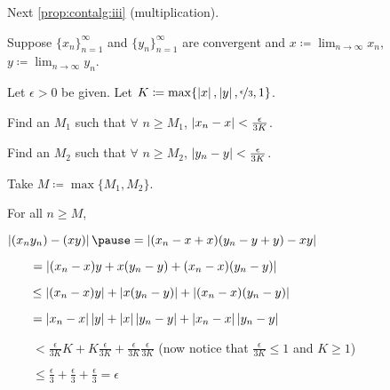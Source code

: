 \documentclass[10pt,aspectratio=169]{beamer}
\begin{document}
\begin{frame}

Next \eqref{prop:contalg:iii} (multiplication).

\pause
\medskip

Suppose $\{ x_n \}_{n=1}^\infty$ and $\{ y_n \}_{n=1}^\infty$ are convergent and
$\displaystyle x \coloneqq \lim_{n\to\infty} x_n$,
$\displaystyle y \coloneqq \lim_{n\to\infty} y_n$.

\pause
\medskip

Let $\epsilon > 0$ be given.
\quad
\pause
Let $K \coloneqq \max\{ \left\lvert {x} \right\rvert, \left\lvert {y} \right\rvert, \nicefrac{\epsilon}{3} , 1 \}$.

\pause
Find an $M_1$ such that $\forall$ $n \geq M_1$,
$\left\lvert {x_n - x} \right\rvert < \frac{\epsilon}{3K}$.

\pause
Find an $M_2$ such that $\forall$ $n \geq M_2$,
$\left\lvert {y_n - y} \right\rvert < \frac{\epsilon}{3K}$.

\pause
Take $M \coloneqq \max \{ M_1, M_2 \}$.

\pause
\medskip

For all $n \geq M$, 

\pause
\medskip

$\displaystyle
\abs{(x_ny_n) - (xy)}
\pause
=
\abs{(x_n-x+x)(y_n-y+y) - xy}
$

\pause
\medskip

$\displaystyle
\qquad
=
\left\lvert {(x_n-x)y + x(y_n-y) +(x_n-x)(y_n-y)} \right\rvert
$

\pause
\medskip

$\displaystyle
\qquad
\leq
\left\lvert {(x_n-x)y} \right\rvert + \left\lvert {x(y_n - y)} \right\rvert +
\left\lvert {(x_n-x)(y_n-y)} \right\rvert 
$

\pause
\medskip

$\displaystyle
\qquad
=
\left\lvert {x_n -x} \right\rvert\left\lvert {y} \right\rvert + 
\left\lvert {x} \right\rvert\left\lvert {y_n -y} \right\rvert + 
\left\lvert {x_n -x} \right\rvert\left\lvert {y_n -y} \right\rvert
$

\pause
\medskip

$\displaystyle
\qquad
<
\frac{\epsilon}{3K} K + 
K \frac{\epsilon}{3K} + 
\frac{\epsilon}{3K}
\frac{\epsilon}{3K}$
\qquad \qquad (now notice that $\tfrac{\epsilon}{3K} \leq 1$
and $K \geq 1$)

\pause
\medskip

$\displaystyle
\qquad
\leq
\frac{\epsilon}{3} + \frac{\epsilon}{3} + \frac{\epsilon}{3}
 = \epsilon$

\end{frame}
\end{document}
